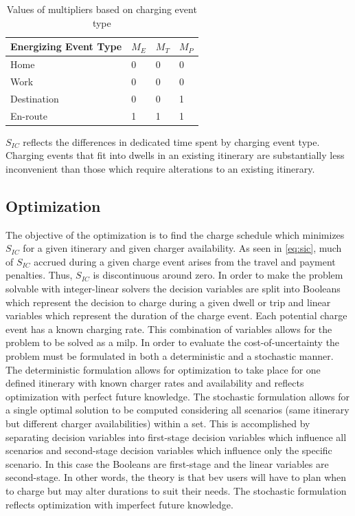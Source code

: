 \documentclass[letterpaper]{sae}
\begin{document}
\begin{table}[H]
	\centering
	\caption{Values of multipliers based on charging event type}\label{tab:met:sic:multipliers}
	\begin{tabular}{|C{\linewidth/2}|C{\linewidth/6}|C{\linewidth/6}|C{\linewidth/6}|}
		\hline Energizing Event Type & $M_E$ & $M_T$ & $M_P$ \\
		\hline Home & 0 & 0 & 0 \\
		\hline Work & 0 & 0 & 0 \\
		\hline Destination & 0 & 0 & 1 \\
		\hline En-route & 1 & 1 & 1 \\
		\hline
	\end{tabular}
\end{table}

$S_{IC}$ reflects the differences in dedicated time spent by charging event type. Charging events that fit into dwells in an existing itinerary are substantially less inconvenient than those which require alterations to an existing itinerary.

\subsection{Optimization}

The objective of the optimization is to find the charge schedule which minimizes $S_{IC}$ for a given itinerary and given charger availability. As seen in \eqref{eq:sic}, much of $S_{IC}$ accrued during a given charge event arises from the travel and payment penalties. Thus, $S_{IC}$ is discontinuous around zero. In order to make the problem solvable with integer-linear solvers the decision variables are split into Booleans which represent the decision to charge during a given dwell or trip and linear variables which represent the duration of the charge event. Each potential charge event has a known charging rate. This combination of variables allows for the problem to be solved as a \gls{milp}. In order to evaluate the cost-of-uncertainty the problem must be formulated in both a deterministic and a stochastic manner. The deterministic formulation allows for optimization to take place for one defined itinerary with known charger rates and availability and reflects optimization with perfect future knowledge. The stochastic formulation allows for a single optimal solution to be computed considering all scenarios (same itinerary but different charger availabilities) within a set. This is accomplished by separating decision variables into first-stage decision variables which influence all scenarios and second-stage decision variables which influence only the specific scenario. In this case the Booleans are first-stage and the linear variables are second-stage. In other words, the theory is that \gls{bev} users will have to plan when to charge but may alter durations to suit their needs. The stochastic formulation reflects optimization with imperfect future knowledge.
\end{document}
